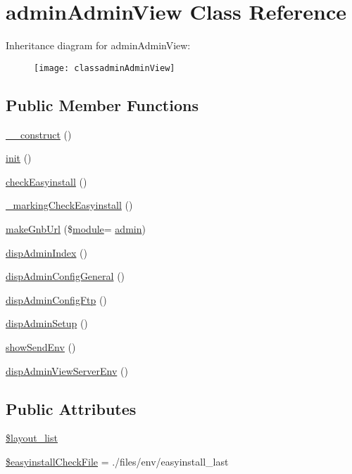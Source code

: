 \hypertarget{classadminAdminView}{}\section{admin\+Admin\+View Class Reference}
\label{classadminAdminView}
Inheritance diagram for admin\+Admin\+View\+:\begin{figure}[H]
\begin{center}
\leavevmode
\texttt{[image: classadminAdminView]}
\end{center}
\end{figure}
\subsection*{Public Member Functions}
\begin{DoxyCompactItemize}
\item 
\hyperlink{classadminAdminView_a8bf927cf8a3c6554d083a29f90a8e3eb}{\+\_\+\+\_\+construct} ()
\item 
\hyperlink{classadminAdminView_a9211d29a895ebead46f78e6fc9eab285}{init} ()
\item 
\hyperlink{classadminAdminView_ae7b11554f7c30beb8554d15b33852dd7}{check\+Easyinstall} ()
\item 
\hyperlink{classadminAdminView_ad1fe5e140900ad8f5814871ed6ae9508}{\+\_\+marking\+Check\+Easyinstall} ()
\item 
\hyperlink{classadminAdminView_ade77034df3a5bc074b5a1f1cb4c47419}{make\+Gnb\+Url} (\$\hyperlink{classmodule}{module}= \textquotesingle{}\hyperlink{classadmin}{admin}\textquotesingle{})
\item 
\hyperlink{classadminAdminView_aff78cea8f2e5632395dd4888742389b8}{disp\+Admin\+Index} ()
\item 
\hyperlink{classadminAdminView_accaee16084bc6def9e841518d227be0e}{disp\+Admin\+Config\+General} ()
\item 
\hyperlink{classadminAdminView_ac1d596c739213d4fd3f127a6ca18c155}{disp\+Admin\+Config\+Ftp} ()
\item 
\hyperlink{classadminAdminView_acfa4a5d1209080974ca5fd15d04565e9}{disp\+Admin\+Setup} ()
\item 
\hyperlink{classadminAdminView_a4c4c900f637d618a7c8fbcbf523ad801}{show\+Send\+Env} ()
\item 
\hyperlink{classadminAdminView_a6b110bb8ccba975a670fdfbe559f7118}{disp\+Admin\+View\+Server\+Env} ()
\end{DoxyCompactItemize}
\subsection*{Public Attributes}
\begin{DoxyCompactItemize}
\item 
\hyperlink{classadminAdminView_a3655428ad4a88938daaa0a44c1ff96ea}{\$layout\+\_\+list}
\item 
\hyperlink{classadminAdminView_a3cfff18fed688e8cf67f4f8bbba79abf}{\$easyinstall\+Check\+File} = \textquotesingle{}./files/env/easyinstall\+\_\+last\textquotesingle{}
\end{DoxyCompactItemize}


